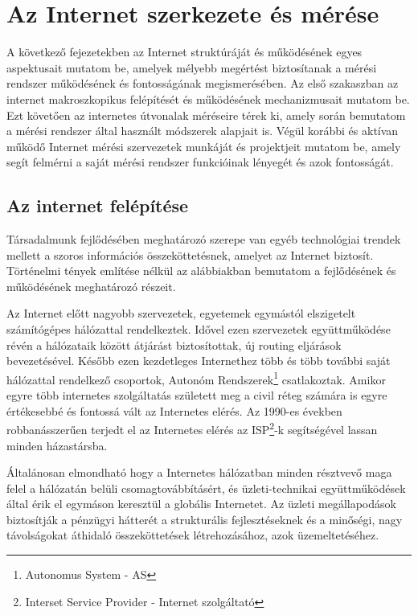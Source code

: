 \chapter{Az Internet szerkezete és mérése}

A következő fejezetekben az Internet struktúráját és működésének egyes aspektusait mutatom be, amelyek mélyebb megértést biztosítanak a mérési rendszer működésének és fontosságának megismerésében.
Az első szakaszban az internet makroszkopikus felépítését és működésének mechanizmusait mutatom be. Ezt követően az internetes útvonalak méréseire térek ki, amely során bemutatom a mérési rendszer által használt módszerek alapjait is. Végül korábbi és aktívan működő Internet mérési szervezetek munkáját és projektjeit mutatom be, amely segít felmérni a saját mérési rendszer funkcióinak lényegét és azok fontosságát.



\section{Az internet felépítése}



Társadalmunk fejlődésében meghatározó szerepe van egyéb technológiai trendek mellett a szoros információs összeköttetésnek, amelyet az Internet biztosít. Történelmi tények említése nélkül az alábbiakban bemutatom a fejlődésének és működésének meghatározó részeit.

Az Internet előtt nagyobb szervezetek, egyetemek egymástól elszigetelt számítógépes hálózattal rendelkeztek. Idővel ezen szervezetek együttműködése révén a hálózataik között átjárást biztosítottak, új routing eljárások bevezetésével. Később ezen kezdetleges Internethez több és több további saját hálózattal rendelkező csoportok, Autonóm Rendszerek\footnote{Autonomus System - AS} csatlakoztak. Amikor egyre több internetes szolgáltatás született meg a civil réteg számára is egyre értékesebbé és fontossá vált az Internetes elérés. Az 1990-es években robbanásszerűen terjedt el az Internetes elérés az ISP\footnote{Interset Service Provider - Internet szolgáltató}-k segítségével lassan minden házastársba.

Általánosan elmondható hogy a Internetes hálózatban minden résztvevő maga felel a hálózatán belüli csomagtovábbításért, és üzleti-technikai együttműködések által érik el egymáson keresztül a globális Internetet. Az üzleti megállapodások biztosítják a pénzügyi hátterét a strukturális fejlesztéseknek és a minőségi, nagy távolságokat áthidaló összeköttetések létrehozásához, azok üzemeltetéséhez.

